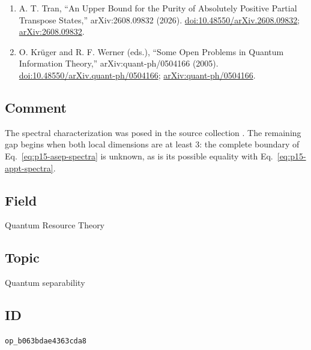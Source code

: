 \begin{enumerate}[label={},leftmargin=4.8em,labelsep=0.5em]
  \item[\textup{[Tra26]}]\label{ref:p15-tran}
  A. T. Tran,
  ``An Upper Bound for the Purity of Absolutely Positive Partial Transpose
  States,'' arXiv:2608.09832 (2026).
  \href{https://doi.org/10.48550/arXiv.2608.09832}{doi:10.48550/arXiv.2608.09832};
  \href{https://arxiv.org/abs/2608.09832}{arXiv:2608.09832}.

  \item[\textup{[KW05]}]\label{ref:p15-krueger-werner}
  O. Krüger and R. F. Werner (eds.),
  ``Some Open Problems in Quantum Information Theory,''
  arXiv:quant-ph/0504166 (2005).
  \href{https://doi.org/10.48550/arXiv.quant-ph/0504166}{doi:10.48550/arXiv.quant-ph/0504166};
  \href{https://arxiv.org/abs/quant-ph/0504166}{arXiv:quant-ph/0504166}.
\end{enumerate}

\subsection*{Comment}

The spectral characterization was posed in the source collection
.  The remaining gap begins when both
local dimensions are at least $3$: the complete boundary of
Eq.~\eqref{eq:p15-asep-spectra} is unknown, as is its possible equality with
Eq.~\eqref{eq:p15-appt-spectra}.

\subsection*{Field}

Quantum Resource Theory

\subsection*{Topic}

Quantum separability

\subsection*{ID}

\texttt{op\_b063bdae4363cda8}
